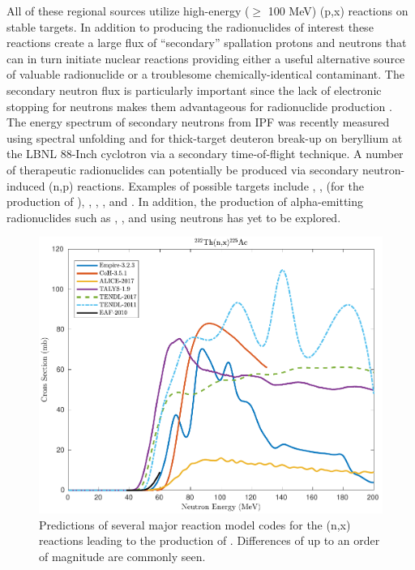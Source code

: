 \documentclass[letterpaper]{ar-1col}
\begin{document}
All of these regional sources utilize high-energy ($\geq$ 100 MeV) (p,x) reactions on stable targets.  In addition to producing the radionuclides of interest these reactions create a large flux of \enquote{secondary} spallation protons and neutrons that can in turn initiate nuclear reactions providing either a useful alternative source of valuable radionuclide or a troublesome chemically-identical contaminant.  The secondary neutron flux is particularly important since the lack of electronic stopping for neutrons makes them advantageous for radionuclide production \cite{Voyles2017}.  The energy spectrum of secondary neutrons from IPF was recently measured using spectral unfolding \cite{Mos16} and for thick-target deuteron break-up on beryllium at the LBNL 88-Inch cyclotron \cite{Harrig2018} via a secondary time-of-flight technique. A number of therapeutic radionuclides can potentially be produced via secondary neutron-induced (n,p) reactions. Examples of possible targets include , ,  (for the production of ), , , , and .  In addition, the production of alpha-emitting radionuclides such as , , and  using neutrons has yet to be explored.


\begin{figure}
 \centering
 \includegraphics[width=0.7\linewidth]{225Ac.pdf}

 \caption{Predictions of several major reaction model codes for the (n,x) reactions leading to the production of .  Differences of up to an order of magnitude are commonly seen.    }
 \label{fig:ithemba_plot}
\end{figure}
\end{document}
